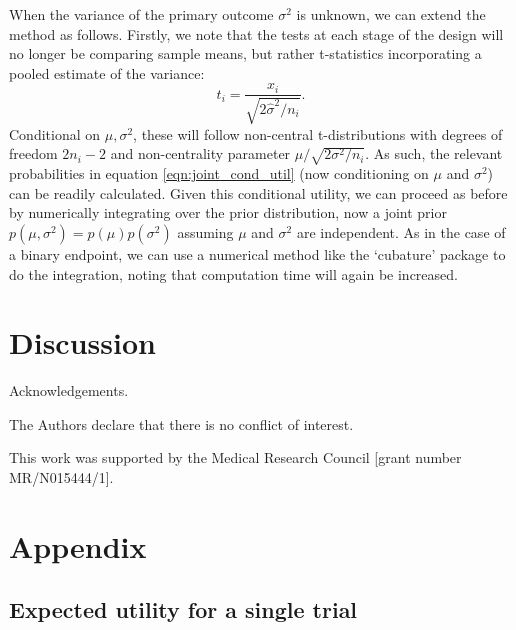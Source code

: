 \documentclass[sagev]{sagej}
\begin{document}
When the variance of the primary outcome $\sigma^2$ is unknown, we can extend the method as follows. Firstly, we note that the tests at each stage of the design will no longer be comparing sample means, but rather t-statistics incorporating a pooled estimate of the variance:
$$
t_i = \frac{x_i}{\sqrt{2\hat{\sigma}^2 / n_i}}.
$$
Conditional on $\mu, \sigma^2$, these will follow non-central t-distributions with degrees of freedom $2n_i - 2$ and non-centrality parameter $\mu/\sqrt{2\sigma^2 / n_i}$. As such, the relevant probabilities in equation \ref{eqn:joint_cond_util} (now conditioning on $\mu$ and $\sigma^2$) can be readily calculated. Given this conditional utility, we can proceed as before by numerically integrating over the prior distribution, now a joint prior $p(\mu, \sigma^2) = p(\mu)p(\sigma^2)$ assuming $\mu$ and $\sigma^2$ are independent. As in the case of a binary endpoint, we can use a numerical method like the `cubature' package to do the integration, noting that computation time will again be increased.

\section{Discussion}



\begin{acks}
Acknowledgements.
\end{acks}

\begin{dci}
The Authors declare that there is no conflict of interest.
\end{dci}

\begin{funding}
This work was supported by the Medical Research Council [grant number MR/N015444/1].
\end{funding}




\section*{Appendix}

\subsection*{Expected utility for a single trial}
\end{document}
